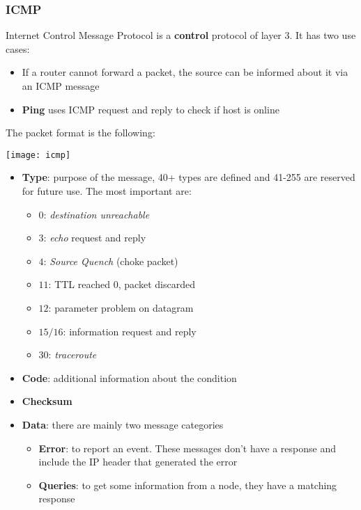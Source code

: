 \subsubsection{ICMP}
Internet Control Message Protocol is a \textbf{control} protocol of layer 3. It has two use cases:
\begin{itemize}
	\item If a router cannot forward a packet, the source can be informed about it via an ICMP message
	\item \textbf{Ping} uses ICMP request and reply to check if host is online
\end{itemize}
The packet format is the following:
\begin{center}
	\texttt{[image: icmp]}
\end{center}
\begin{itemize}
	\item \textbf{Type}: purpose of the message, 40+ types are defined and 41-255 are reserved for future use. The most important are:
	\begin{itemize}
		\item $0$: \textit{destination unreachable}
		\item $3$: \textit{echo} request and reply
		\item $4$: \textit{Source Quench} (choke packet)
		\item $11$: TTL reached 0, packet discarded
		\item $12$: parameter problem on datagram
		\item $15/16$: information request and reply
		\item $30$: \textit{traceroute}
	\end{itemize}
	\item \textbf{Code}: additional information about the condition
	\item \textbf{Checksum}
	\item \textbf{Data}: there are mainly two message categories
	\begin{itemize}
		\item \textbf{Error}: to report an event. These messages don't have a response and include the IP header that generated the error
		\item \textbf{Queries}: to get some information from a node, they have a matching response
	\end{itemize}
\end{itemize}

